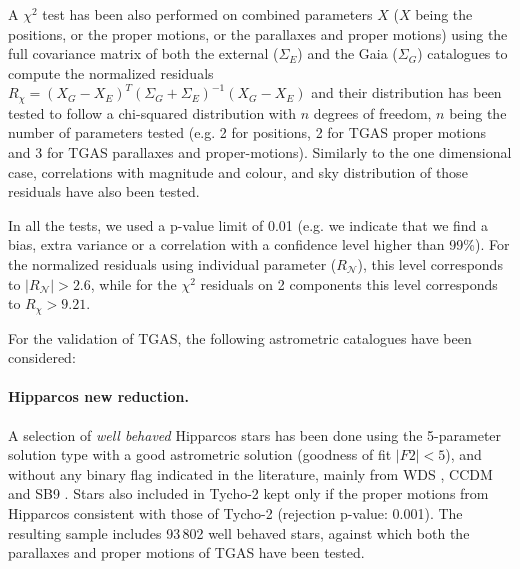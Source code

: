 A $\chi^2$ test has been also performed on combined parameters $X$ ($X$ being the positions, or the proper motions, or the parallaxes and proper motions) using the full covariance matrix of both the external ($\Sigma_E$) and the Gaia ($\Sigma_G$) catalogues to compute the normalized residuals $R_{\chi}=(X_G-X_E)^T (\Sigma_G+\Sigma_E)^{-1} (X_G-X_E)$  and their distribution has been tested to follow a chi-squared distribution with $n$ degrees of freedom, $n$ being the number of parameters tested (e.g. 2 for {} positions, 2 for TGAS proper motions and 3 for TGAS parallaxes and proper-motions). Similarly to the one dimensional case, correlations with magnitude and colour, and sky distribution of those residuals have also been tested. 

In all the tests, we used a p-value limit of 0.01 (e.g. we indicate that we find a bias, extra variance or a correlation with a confidence level higher than 99\%). For the normalized residuals using individual parameter ($R_\mathcal{N}$), this level corresponds to $\vert R_\mathcal{N} \vert>2.6$, while for the $\chi^2$ residuals on 2 components this level corresponds to $R_{\chi}>9.21$.


For the validation of TGAS, the following astrometric catalogues have been considered:
\paragraph{Hipparcos new reduction.} %
A selection of {\it well behaved} Hipparcos stars has been done using the 5-parameter solution type with a good astrometric solution (goodness of fit $\vert F2 \vert<5$), and without any binary flag indicated in the literature, mainly from WDS \citep{WDS}, CCDM \citep[Catalogue of the Components of Double and Multiple Stars,][]{2000A&A...363..991D} and SB9 \citep[9th Catalogue of Spectroscopic Binary Orbits,][]{2004A&A...424..727P}\beforeReferee{)}. Stars also included in Tycho-2  kept only if the proper motions from Hipparcos  consistent with those of Tycho-2 (rejection p-value: 0.001). The resulting sample includes 93\,802 well behaved stars, against which both the parallaxes and proper motions of TGAS have been tested. 

